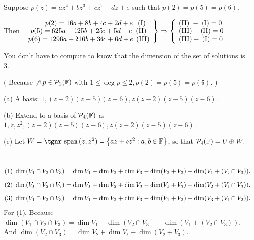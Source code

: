 \documentclass[a4paper, 11pt, UTF8]{article}
\def\Spn{{\textup{\tgnr span}}\,}
\def\Fbb{{\mathbb{F}}}
\def\BulletPoint{{\small\bullet}}
\def\Tips{{\tgbfx\large T{\footnotesize IPS:}}}
\begin{document}
\begin{large}
Suppose $p(z)=az^4+bz^3+cz^2+dz+e$ such that $p(2)=p(5)=p(6)$.\vspace{4pt}\par\quad
Then $\left|\begin{array}{r}
	p(2)=16a+8b+4c+2d+e\,\;\;(\TXT{I})\;\;\\
	p(5)=625a+125b+25c+5d+e\;\;(\TXT{II})\,\;\\
	p(6)=1296a+216b+36c+6d+e\;\,(\TXT{III})
\end{array}\right\}\Rightarrow\MathLeftBrace{l}{
	(\TXT{II})\;-\;(\TXT{I})=0\\
	(\TXT{III})-(\TXT{II})=0\\
	(\TXT{III})-\;(\TXT{I})=0\\
}$\vspace{4pt}\par\quad
{\tgsl You don't have to compute to know that the dimension of the set of solutions is 3.}\par\quad
( Because $\not\exists\,p\in\PoF{2}$ with $1\leq\deg p\leq 2,p(2)=p(5)=p(6).$ )\par\quad
(a) A basis: $1,(z-2)(z-5)(z-6),z(z-2)(z-5)(z-6).$\par\quad
(b) Extend to a basis of $\PoF{4}$ as $1,z,z^2,(z-2)(z-5)(z-6),z(z-2)(z-5)(z-6).$\par\quad
(c) Let $W=\Spn(z,z^2)=\left\{az+bz^2:a,b\in\Fbb\right\}$, so that $\PoF{4}=U\oplus W.$\PfEnd
\SepLine

\BulletPoint \,\hspace{1pt}\Tips\vspace{-30pt}\TextB{}
$$(1)\;\dim(V_1\cap V_2\cap V_3)=\dim V_1+\dim V_2+\dim V_3-\dim(V_2+V_3)-\dim(V_1+(V_2\cap V_3)).\vspace{-46pt}$$\TextB{}
$$(2)\;\dim(V_1\cap V_2\cap V_3)=\dim V_1+\dim V_2+\dim V_3-\dim(V_1+V_3)-\dim(V_2+(V_1\cap V_3)).\vspace{-46pt}$$\TextB{}
$$(3)\;\dim(V_1\cap V_2\cap V_3)=\dim V_1+\dim V_2+\dim V_3-\dim(V_1+V_2)-\dim(V_3+(V_1\cap V_2)).\vspace{-6pt}$$\TextB{}
For (1). Because $\dim (V_1\cap V_2\cap V_3)=\dim V_1+\dim(V_2\cap V_3)-\dim(V_1+(V_2\cap V_3)).$\TextB{}
And $\dim(V_2\cap V_3)=\dim V_2+\dim V_3-\dim(V_2+V_3).$\par
\SepLine


\end{large}
\end{document}
